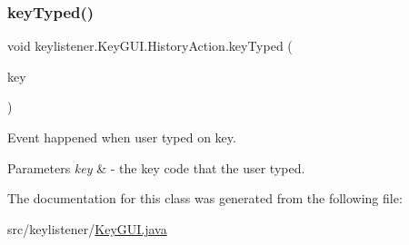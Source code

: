 \subsubsection{\texorpdfstring{key\+Typed()}{keyTyped()}}
{\footnotesize\ttfamily void keylistener.\+Key\+G\+U\+I.\+History\+Action.\+key\+Typed (\begin{DoxyParamCaption}\item[{Key\+Event}]{key }\end{DoxyParamCaption})\hspace{0.3cm}{\ttfamily [inline]}}

Event happened when user typed on key. 
\begin{DoxyParams}{Parameters}
{\em key} & -\/ the key code that the user typed. \\
\hline
\end{DoxyParams}


The documentation for this class was generated from the following file\+:\begin{DoxyCompactItemize}
\item 
src/keylistener/\hyperlink{_key_g_u_i_8java}{Key\+G\+U\+I.\+java}\end{DoxyCompactItemize}
